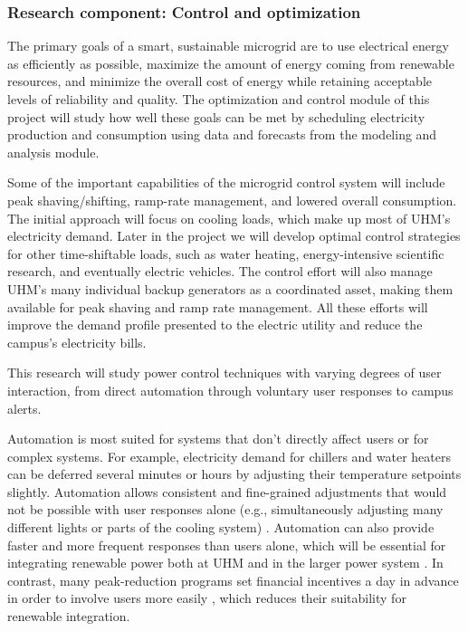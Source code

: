 
\subsubsection{Research component: Control and optimization}
\label{sec:control}

The primary goals of a smart, sustainable microgrid are to use electrical
energy as efficiently as possible, maximize the amount of energy coming
from renewable resources, and minimize the overall cost of energy while
retaining acceptable levels of reliability and quality. The optimization
and control module of this project will study how well
these goals can be met by scheduling electricity production and consumption
using data and forecasts from the modeling and analysis module.

Some of the important capabilities of the microgrid control system will
include peak shaving/shifting, ramp-rate management, and lowered overall
consumption.  The initial approach will focus on cooling loads, which make
up most of UHM's electricity demand.  Later in the project we will develop
optimal control strategies for other time-shiftable loads, such as water
heating, energy-intensive scientific research, and eventually electric
vehicles. The control effort will also manage UHM's many individual backup
generators as a coordinated asset, making them available for peak shaving
and ramp rate management. All these efforts will improve the demand profile
presented to the electric utility and reduce the campus's electricity
bills.

This research will study power control techniques with varying degrees of user 
interaction, from direct automation through voluntary user responses to campus 
alerts. 

Automation is most suited for systems that don't directly affect users or
for complex systems. For example, electricity demand for chillers and water
heaters can be deferred several minutes or hours by adjusting their
temperature setpoints slightly. Automation allows consistent and
fine-grained adjustments that would not be possible with user responses
alone (e.g., simultaneously adjusting many different lights or parts of the
cooling system) \cite{Motegi07, Piette06}. Automation can also provide
faster and more frequent responses than users alone, which will be
essential for integrating renewable power both at UHM and in the larger
power system \cite{Stromback11,Callaway09}.  In contrast, many
peak-reduction programs set financial incentives a day in advance in order
to involve users more easily \cite{Boisvert04, Stromback11}, which reduces
their suitability for renewable integration.
 
